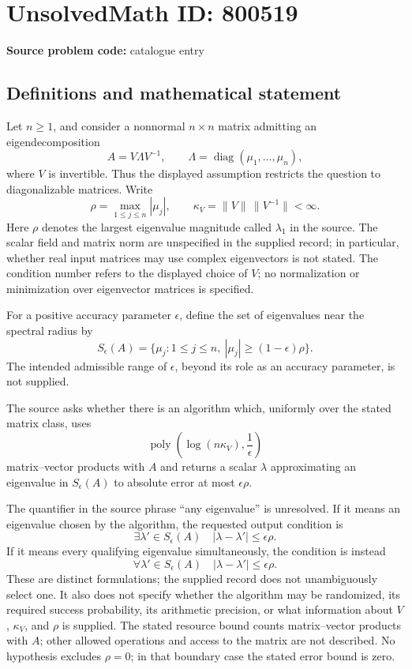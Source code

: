 \documentclass[11pt]{article}
\begin{document}
\section*{UnsolvedMath ID: 800519}
\textbf{Source problem code:} catalogue entry
\subsection{Definitions and mathematical statement}
Let \(n\geq 1\), and consider a nonnormal \(n\times n\) matrix admitting an eigendecomposition
\[
A=V\Lambda V^{-1},\qquad
\Lambda=\operatorname{diag}(\mu_1,\ldots,\mu_n),
\]
where \(V\) is invertible. Thus the displayed assumption restricts the question to diagonalizable matrices. Write
\[
\rho=\max_{1\leq j\leq n}|\mu_j|,
\qquad
\kappa_V=\|V\|\,\|V^{-1}\|<\infty.
\]
Here \(\rho\) denotes the largest eigenvalue magnitude called \(\lambda_1\) in the source. The scalar field and matrix norm are unspecified in the supplied record; in particular, whether real input matrices may use complex eigenvectors is not stated. The condition number refers to the displayed choice of \(V\); no normalization or minimization over eigenvector matrices is specified.

For a positive accuracy parameter \(\epsilon\), define the set of eigenvalues near the spectral radius by
\[
S_\epsilon(A)=\{\mu_j:1\leq j\leq n,\ |\mu_j|\geq(1-\epsilon)\rho\}.
\]
The intended admissible range of \(\epsilon\), beyond its role as an accuracy parameter, is not supplied.

The source asks whether there is an algorithm which, uniformly over the stated matrix class, uses
\[
\operatorname{poly}\!\left(\log(n\kappa_V),\frac{1}{\epsilon}\right)
\]
matrix--vector products with \(A\) and returns a scalar \(\lambda\) approximating an eigenvalue in \(S_\epsilon(A)\) to absolute error at most \(\epsilon\rho\).

The quantifier in the source phrase ``any eigenvalue'' is unresolved. If it means an eigenvalue chosen by the algorithm, the requested output condition is
\[
\exists\lambda'\in S_\epsilon(A)
\quad |\lambda-\lambda'|\leq\epsilon\rho.
\]
If it means every qualifying eigenvalue simultaneously, the condition is instead
\[
\forall\lambda'\in S_\epsilon(A)
\quad |\lambda-\lambda'|\leq\epsilon\rho.
\]
These are distinct formulations; the supplied record does not unambiguously select one. It also does not specify whether the algorithm may be randomized, its required success probability, its arithmetic precision, or what information about \(V\), \(\kappa_V\), and \(\rho\) is supplied. The stated resource bound counts matrix--vector products with \(A\); other allowed operations and access to the matrix are not described. No hypothesis excludes \(\rho=0\); in that boundary case the stated error bound is zero.
\end{document}

